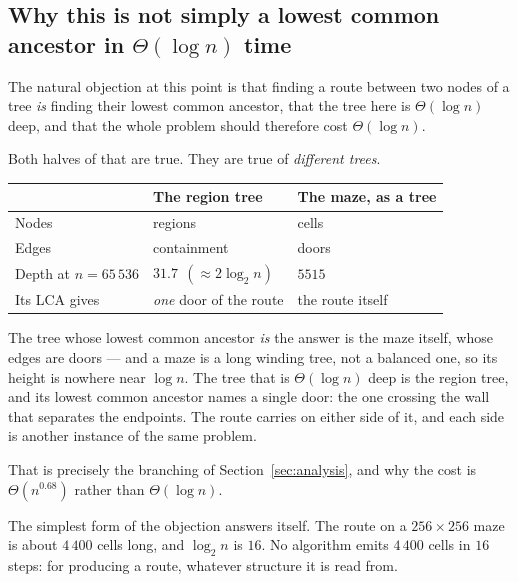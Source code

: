 \subsection{Why this is not simply a lowest common ancestor in \texorpdfstring{$\Theta(\log n)$}{log n} time}
\label{sec:two-trees}

The natural objection at this point is that finding a route between two nodes of
a tree \emph{is} finding their lowest common ancestor, that the tree here is
$\Theta(\log n)$ deep, and that the whole problem should therefore cost
$\Theta(\log n)$.

Both halves of that are true. They are true of \emph{different trees}.

\begin{center}
\begin{tabular}{@{}lll@{}}
  \toprule
  & The region tree & The maze, as a tree \\
  \midrule
  Nodes        & regions             & cells \\
  Edges        & containment         & doors \\
  Depth at $n=65\,536$ & $31.7\ \ (\approx 2\log_2 n)$ & $5515$ \\
  Its LCA gives & \emph{one} door of the route & the route itself \\
  \bottomrule
\end{tabular}
\end{center}

The tree whose lowest common ancestor \emph{is} the answer is the maze itself,
whose edges are doors --- and a maze is a long winding tree, not a balanced one,
so its height is nowhere near $\log n$. The tree that is $\Theta(\log n)$ deep is
the region tree, and its lowest common ancestor names a single door: the one
crossing the wall that separates the endpoints. The route carries on either side
of it, and each side is another instance of the same problem.

That is precisely the branching of Section~\ref{sec:analysis}, and why the cost
is $\Theta(n^{0.68})$ rather than $\Theta(\log n)$.

\begin{keypoint}
The simplest form of the objection answers itself. The route on a
$256\times256$ maze is about $4\,400$ cells long, and $\log_2 n$ is $16$. No
algorithm emits $4\,400$ cells in $16$ steps: 
for producing a route, whatever structure it is read from.
\end{keypoint}

